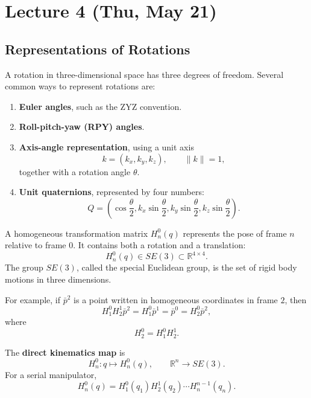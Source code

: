 \documentclass[../../master-handout.tex]{subfiles}
\begin{document}
\section{Lecture 4 (Thu, May 21)}

\subsection{Representations of Rotations}

A rotation in three-dimensional space has three degrees of freedom. Several common ways to represent rotations are:

\begin{enumerate}
    \item \textbf{Euler angles}, such as the ZYZ convention.
    \item \textbf{Roll-pitch-yaw (RPY) angles}.
    \item \textbf{Axis-angle representation}, using a unit axis
    \[
        k = (k_x, k_y, k_z), \qquad \|k\| = 1,
    \]
    together with a rotation angle \(\theta\).
    \item \textbf{Unit quaternions}, represented by four numbers:
    \[
        Q =
        \left(
            \cos{\frac{\theta}{2}},
            k_x \sin{\frac{\theta}{2}},
            k_y \sin{\frac{\theta}{2}},
            k_z \sin{\frac{\theta}{2}}
        \right).
    \]
\end{enumerate}


A homogeneous transformation matrix \(H_n^0(q)\) represents the pose of frame \(n\) relative to frame \(0\). It contains both a rotation and a translation:
\[
    H_n^0(q) \in SE(3) \subset \mathbb{R}^{4 \times 4}.
\]
The group \(SE(3)\), called the special Euclidean group, is the set of rigid body motions in three dimensions.

For example, if \(\bar{p}^2\) is a point written in homogeneous coordinates in frame \(2\), then
\[
    H_1^0 H_2^1 \bar{p}^2
    =
    H_1^0 \bar{p}^1
    =
    \bar{p}^0
    =
    H_2^0 \bar{p}^2,
\]
where
\[
    H_2^0 = H_1^0 H_2^1.
\]

The \textbf{direct kinematics map} is
\[
    H_n^0 : q \mapsto H_n^0(q),
    \qquad
    \mathbb{R}^n \to SE(3).
\]
For a serial manipulator,
\[
    H_n^0(q)
    =
    H_1^0(q_1)
    H_2^1(q_2)
    \cdots
    H_n^{n-1}(q_n).
\]
\end{document}
